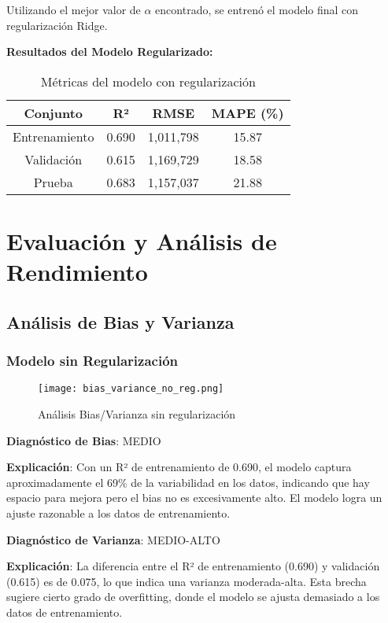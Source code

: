 \documentclass[11pt,a4paper]{article}
\begin{document}
Utilizando el mejor valor de $\alpha$ encontrado, se entrenó el modelo final con regularización Ridge.

\textbf{Resultados del Modelo Regularizado:}
\begin{table}[H]
    \centering
    \begin{tabular}{|c|c|c|c|}
    \hline
    \textbf{Conjunto} & \textbf{R²} & \textbf{RMSE} & \textbf{MAPE (\%)} \\
    \hline
    Entrenamiento & 0.690 & 1,011,798 & 15.87 \\
    Validación & 0.615 & 1,169,729 & 18.58 \\
    Prueba & 0.683 & 1,157,037 & 21.88 \\
    \hline
    \end{tabular}
    \caption{Métricas del modelo con regularización}
    \label{tab:regularized_model}
\end{table}

\section{Evaluación y Análisis de Rendimiento}

\subsection{Análisis de Bias y Varianza}

\subsubsection{Modelo sin Regularización}

\begin{figure}[H]
    \centering
    \texttt{[image: bias\_variance\_no\_reg.png]}
    \caption{Análisis Bias/Varianza sin regularización}
    \label{fig:bias_var_no_reg}
\end{figure}

\textbf{Diagnóstico de Bias}: MEDIO

\textbf{Explicación}: Con un R² de entrenamiento de 0.690, el modelo captura aproximadamente el 69\% de la variabilidad en los datos, indicando que hay espacio para mejora pero el bias no es excesivamente alto. El modelo logra un ajuste razonable a los datos de entrenamiento.

\textbf{Diagnóstico de Varianza}: MEDIO-ALTO

\textbf{Explicación}: La diferencia entre el R² de entrenamiento (0.690) y validación (0.615) es de 0.075, lo que indica una varianza moderada-alta. Esta brecha sugiere cierto grado de overfitting, donde el modelo se ajusta demasiado a los datos de entrenamiento.
\end{document}
